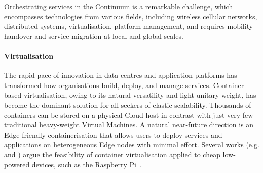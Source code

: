 Orchestrating services in the Continuum is a remarkable challenge, which encompasses technologies from various fields, including wireless cellular networks, distributed systems, virtualisation, platform management, and requires mobility handover and service migration at local and global scales.

\paragraph{Virtualisation}
\label{sec:virtualisation}

The rapid pace of innovation in data centres and application platforms has transformed how organisations build, deploy, and manage services.
Container-based virtualisation, owing to its natural versatility and light unitary weight, has become the dominant solution for all seekers of elastic scalability.
Thousands of containers can be stored on a physical Cloud host in contrast with just very few traditional heavy-weight Virtual Machines. 
A natural near-future direction is an Edge-friendly containerisation that allows users to deploy services and applications on heterogeneous Edge nodes with minimal effort. 
Several works (e.g. \cite{pahl2016container} and \cite{bellavista2017feasibility}) argue the feasibility of container virtualisation applied to cheap low-powered devices, such as the Raspberry Pi~\cite{raspberry}. 

